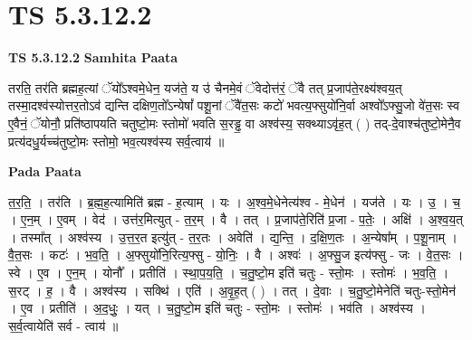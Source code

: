 \documentclass[17pt]{extarticle}
\begin{document}

\section{ TS 5.3.12.2 }

\textbf{TS 5.3.12.2 } \newline
\textbf{Samhita Paata} \newline

तरति॒ तर॑ति ब्रह्मह॒त्यां ॅयो᳚ऽश्वमे॒धेन॒ यज॑ते॒ य उ॑ चैनमे॒वं ॅवेदोत्त॑रं॒ ॅवै तत् प्र॒जाप॑ते॒रक्ष्य॑श्वय॒त् तस्मा॒दश्व॑स्योत्तर॒तोऽव॑ द्यन्ति दक्षिण॒तो᳚ऽन्येषां᳚ पशू॒नां ॅवै॑त॒सः कटो॑ भवत्य॒फ्सुयो॑नि॒र्वा अश्वो᳚ऽफ्सु॒जो वे॑त॒सः स्व ए॒वैनं॒ ॅयोनौ॒ प्रति॑ष्ठापयति चतुष्टो॒मः स्तोमो॑ भवति स॒रड्ढ॒ वा अश्व॑स्य॒ सक्थ्याऽवृ॑ह॒त् ( ) तद्-दे॒वाश्च॑तुष्टो॒मेनै॒व प्रत्य॑दधु॒र्यच्च॑तुष्टो॒मः स्तोमो॒ भव॒त्यश्व॑स्य सर्व॒त्वाय॑ ॥ \newline

\textbf{Pada Paata} \newline

त॒र॒ति॒ । तर॑ति । ब्र॒ह्म॒ह॒त्यामिति॑ ब्रह्म - ह॒त्याम् । यः । अ॒श्व॒मे॒धेनेत्य॑श्व - मे॒धेन॑ । यज॑ते । यः । उ॒ । च॒ । ए॒न॒म् । ए॒वम् । वेद॑ । उत्त॑र॒मित्युत् - त॒र॒म् । वै । तत् । प्र॒जाप॑ते॒रिति॑ प्र॒जा - प॒तेः॒ । अक्षि॑ । अ॒श्व॒य॒त् । तस्मा᳚त् । अश्व॑स्य । उ॒त्त॒र॒त इत्यु॑त् - त॒र॒तः । अवेति॑ । द्य॒न्ति॒ । द॒क्षि॒ण॒तः । अ॒न्येषा᳚म् । प॒शू॒नाम् । वै॒त॒सः । कटः॑ । भ॒व॒ति॒ । अ॒फ्सुयो॑नि॒रित्य॒फ्सु - यो॒निः॒ । वै । अश्वः॑ । अ॒फ्सु॒ज इत्य॑फ्सु - जः । वे॒त॒सः । स्वे । ए॒व । ए॒न॒म् । योनौ᳚ । प्रतीति॑ । स्था॒प॒य॒ति॒ । च॒तु॒ष्टो॒म इति॑ चतुः - स्तो॒मः । स्तोमः॑ । भ॒व॒ति॒ । स॒रट् । ह॒ । वै । अश्व॑स्य । सक्थि॑ । एति॑ । अ॒वृ॒ह॒त् ( ) । तत् । दे॒वाः । च॒तु॒ष्टो॒मेनेति॑ चतुः-स्तो॒मेन॑ । ए॒व । प्रतीति॑ । अ॒द॒धुः॒ । यत् । च॒तु॒ष्टो॒म इति॑ चतुः - स्तो॒मः । स्तोमः॑ । भव॑ति । अश्व॑स्य । स॒र्व॒त्वायेति॑ सर्व - त्वाय॑ ॥  \newline
\end{document}

